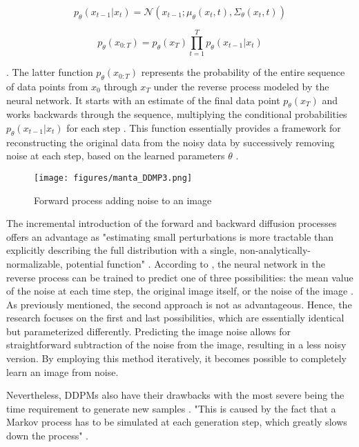 \[
  p_\theta(x_{t-1} | x_t) = \mathcal{N}(x_{t-1}; \mu_\theta(x_t, t), \Sigma_\theta(x_t, t))
\] 

\[p_\theta(x_{0:T}) = p_\theta(x_{T}) \prod_{t=1}^T p_\theta(x_{t-1} | x_t) \]

\citep{martinez2023understanding}. The latter function \( p_\theta(x_{0:T}) \) represents the probability of the entire sequence of data points from \( x_0 \) through \( x_T \) under the reverse process modeled by the neural network. It starts with an estimate of the final data point \( p_\theta(x_{T}) \) and works backwards through the sequence, multiplying the conditional probabilities \( p_\theta(x_{t-1} | x_t) \) for each step \citep{hoDDPMs,martinez2023understanding}. This function essentially provides a framework for reconstructing the original data from the noisy data by successively removing noise at each step, based on the learned parameters \( \theta \) \citep{yangdiffusionSummary}.


\begin{figure}[ht]
  \centering
    \texttt{[image: figures/manta\_DDMP3.png]}
    \caption{Forward process adding noise to an image}
    \label{fig:figureReverseProcess}
\end{figure}


The incremental introduction of the forward and backward diffusion processes offers an advantage as "estimating small perturbations is more tractable than explicitly describing the full distribution with a single, non-analytically-normalizable, potential function" \citep{sohlDDPM}.
According to \citep{hoDDPMs}, the neural network in the reverse process can be trained to predict one of three possibilities: the mean value of the noise at each time step, the original image itself, or the noise of the image \citep{hoDDPMs}. As previously mentioned, the second approach is not as advantageous. Hence, the research focuses on the first and last possibilities, which are essentially identical but parameterized differently. Predicting the image noise allows for straightforward subtraction of the noise from the image, resulting in a less noisy version. By employing this method iteratively, it becomes possible to completely learn an image from noise.

Nevertheless, DDPMs also have their drawbacks with the most severe being the time requirement to generate new samples \citep{xiao2022tackling}. "This is caused by the fact that a Markov process has to be simulated at each generation step, which greatly slows down the process" \citep {martinez2023understanding}. 

